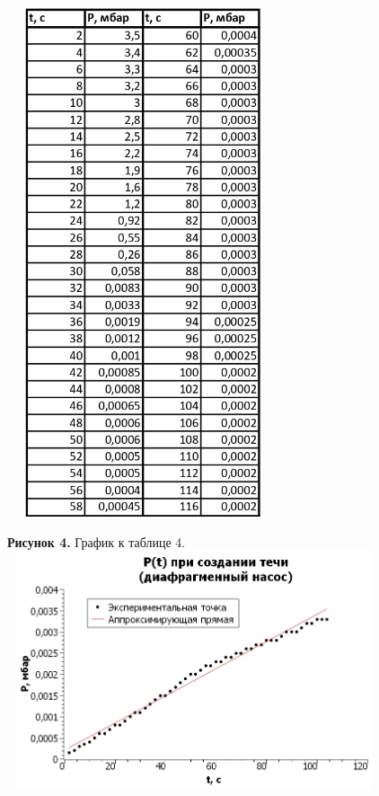 \documentclass[15pt,a5paper,reqno]{article}
\begin{document}
    \centering\includegraphics[width = 8cm, height = 15cm]{Турбомолекулярный насос, PPT 100_page-0001.jpg}
    
    \newpage
    \noindent\textbf{Рисунок 4.} График к таблице 4.
    \includegraphics[width = 11cm, height = 7cm]{Течь, PPT 100.jpg}
\end{document}

